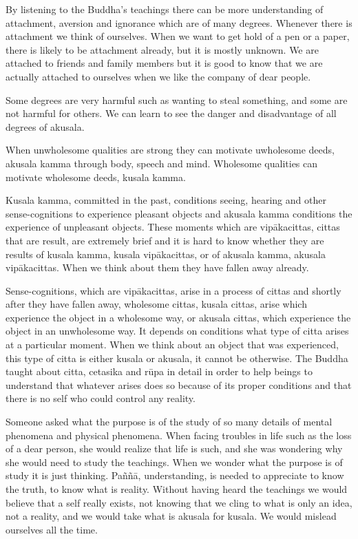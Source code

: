 \documentclass{book}
\begin{document}
By listening to the Buddha's teachings
there can be more understanding of attachment, aversion and ignorance
which are of many degrees. Whenever there is attachment we think of
ourselves. When we want to get hold of a pen or a paper, there is likely
to be attachment already, but it is mostly unknown. We are attached to
friends and family members but it is good to know that we are actually
attached to ourselves when we like the company of dear people.

Some degrees are very harmful such as
wanting to steal something, and some are not harmful for others. We can
learn to see the danger and disadvantage of all degrees of akusala. 

When unwholesome qualities are strong they
can motivate uwholesome deeds, akusala kamma through body, speech and
mind. Wholesome qualities can motivate wholesome deeds, kusala kamma.


Kusala kamma, committed in the past,
conditions seeing, hearing and other sense-cognitions to experience
pleasant objects and akusala kamma conditions the experience of
unpleasant objects. These moments which are vipākacittas, cittas that
are result, are extremely brief and it is hard to know whether they are
results of kusala kamma, kusala vipākacittas, or of akusala kamma,
akusala vipākacittas. When we think about them they have fallen away
already. 

Sense-cognitions, which are vipākacittas,
arise in a process of cittas and shortly after they have fallen away,
wholesome cittas, kusala cittas, arise which experience the object in a
wholesome way, or akusala cittas, which experience the object in an
unwholesome way. It depends on conditions what type of citta arises at a
particular moment. When we think about an object that was experienced,
this type of citta is either kusala or akusala, it cannot be otherwise.
The Buddha taught about citta, cetasika and rūpa in detail in order to
help beings to understand that whatever arises does so because of its
proper conditions and that there is no self who could control any
reality. 

Someone asked what the purpose is of the
study of so many details of mental phenomena and physical phenomena.
When facing troubles in life such as the loss of a dear person, she
would realize that life is such, and she was wondering why she would
need to study the teachings. When we wonder what the purpose is of study
it is just thinking. Paññā, understanding, is needed to appreciate to
know the truth, to know what is reality. Without having heard the
teachings we would believe that a self really exists, not knowing that
we cling to what is only an idea, not a reality, and we would take what
is akusala for kusala. We would mislead ourselves all the time. 
\end{document}
